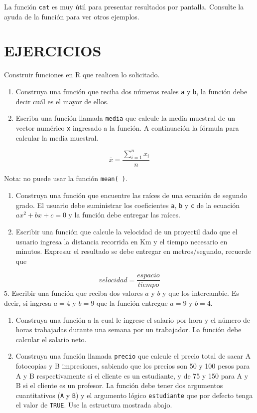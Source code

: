 \documentclass[10pt,]{krantz}
\let\proglang=\textsf
\let\BeginKnitrBlock\begin \let\EndKnitrBlock\end
\begin{document}
\BeginKnitrBlock{rmdnote}
La función \texttt{cat} es muy útil para presentar resultados por
pantalla. Consulte la ayuda de la función para ver otros ejemplos.
\EndKnitrBlock{rmdnote}

\section*{EJERCICIOS}\label{ejercicios-2}


Construir funciones en \proglang{R} que realicen lo solicitado.

\begin{enumerate}
\def\labelenumi{\arabic{enumi}.}
\item
  Construya una función que reciba dos números reales \texttt{a} y
  \texttt{b}, la función debe decir cuál es el mayor de ellos.
\item
  Escriba una función llamada \texttt{media} que calcule la media
  muestral de un vector numérico \texttt{x} ingresado a la función. A
  continuación la fórmula para calcular la media muestral.
\end{enumerate}

\[\bar{x}=\frac{\sum_{i=1}^n x_i}{n}\]

Nota: no puede usar la función \texttt{mean(\ )}.

\begin{enumerate}
\def\labelenumi{\arabic{enumi}.}
\setcounter{enumi}{2}
\item
  Construya una función que encuentre las raíces de una ecuación de
  segundo grado. El usuario debe suministrar los coeficientes
  \texttt{a}, \texttt{b} y \texttt{c} de la ecuación \(ax^2+bx+c=0\) y
  la función debe entregar las raíces.
\item
  Escribir una función que calcule la velocidad de un proyectil dado que
  el usuario ingresa la distancia recorrida en Km y el tiempo necesario
  en minutos. Expresar el resultado se debe entregar en metros/segundo,
  recuerde que
\end{enumerate}

\[velocidad = \frac{espacio}{tiempo}\] 5. Escribir una función que
reciba dos valores \(a\) y \(b\) y que los intercambie. Es decir, si
ingresa \(a=4\) y \(b=9\) que la función entregue \(a=9\) y \(b=4\).

\begin{enumerate}
\def\labelenumi{\arabic{enumi}.}
\setcounter{enumi}{5}
\item
  Construya una función a la cual le ingrese el salario por hora y el
  número de horas trabajadas durante una semana por un trabajador. La
  función debe calcular el salario neto.
\item
  Construya una función llamada \texttt{precio} que calcule el precio
  total de sacar A fotocopias y B impresiones, sabiendo que los precios
  son 50 y 100 pesos para A y B respectivamente si el cliente es un
  estudiante, y de 75 y 150 para A y B si el cliente es un profesor. La
  función debe tener dos argumentos cuantitativos (\texttt{A} y
  \texttt{B}) y el argumento lógico \texttt{estudiante} que por defecto
  tenga el valor de \texttt{TRUE}. Use la estructura mostrada abajo.
\end{enumerate}
\end{document}
